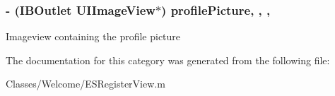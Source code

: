 \subsubsection[{profile\+Picture}]{\setlength{\rightskip}{0pt plus 5cm}-\/ (I\+B\+Outlet U\+I\+Image\+View$\ast$) profile\+Picture\hspace{0.3cm}{\ttfamily [read]}, {\ttfamily [write]}, {\ttfamily [nonatomic]}, {\ttfamily [strong]}}\label{category_e_s_register_view_07_08_a42e9a610f916fec8ad9e989c9cbcf239}
Imageview containing the profile picture 

The documentation for this category was generated from the following file\+:\begin{DoxyCompactItemize}
\item 
Classes/\+Welcome/E\+S\+Register\+View.\+m\end{DoxyCompactItemize}

